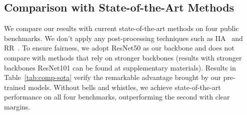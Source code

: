 \documentclass[10pt,twocolumn,letterpaper]{article}
\begin{document}
\vspace{-0.5em}
\subsection{Comparison with State-of-the-Art Methods}
\vspace{-0.5em}
We compare our results with current state-of-the-art methods on four public benchmarks. 
We don't apply any post-processing techniques such as IIA~\cite{fu2020improving} and RR~\cite{zhong2017re}. 
To ensure fairness, we adopt ResNet50 as our backbone and does not compare with methods that rely on stronger backbones (results with stronger backbones \eg ResNet101 can be found at supplementary materials). Results in Table~\ref{tab:comp-sota} verify the remarkable advantage brought by our pre-trained models.
Without bells and whistles, we achieve state-of-the-art performance on all four benchmarks, outperforming the second with clear margins.
\end{document}
